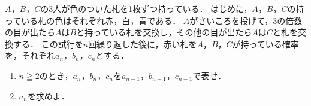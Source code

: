 \documentclass[../../main.tex]{subfiles}
\begin{document}
$A$，$B$，$C$の3人が色のついた札を1枚ずつ持っている．
はじめに，$A$，$B$，$C$の持っている札の色はそれぞれ赤，白，青である．
$A$がさいころを投げて，3の倍数の目が出たら$A$は$B$と持っている札を交換し，その他の目が出たら$A$は$C$と札を交換する．
この試行を$n$回繰り返した後に，赤い札を$A$，$B$，$C$が持っている確率を，それぞれ$a_n$，$b_n$，$c_n$とする．
\begin{enumerate}
  \item $n\geqq2$のとき，$a_n$，$b_n$，$c_n$を$a_{n-1}$，$b_{n-1}$，$c_{n-1}$で表せ．
  \item $a_n$を求めよ．
\end{enumerate}
\end{document}
